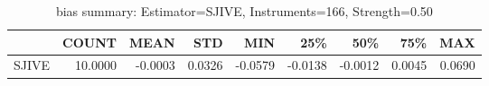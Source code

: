 \begin{table}[ht]
\centering
\caption{bias summary: Estimator=SJIVE, Instruments=166, Strength=0.50}
\begin{tabular}{lrrrrrrrr}
\toprule
 & COUNT & MEAN & STD & MIN & 25\% & 50\% & 75\% & MAX \\
\midrule
SJIVE & 10.0000 & -0.0003 & 0.0326 & -0.0579 & -0.0138 & -0.0012 & 0.0045 & 0.0690 \\
\bottomrule
\end{tabular}
\end{table}
